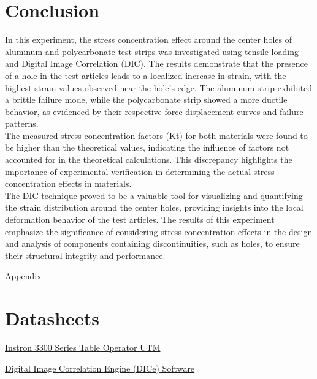 \documentclass{article}
\begin{document}
\section{Conclusion}

In this experiment, the stress concentration effect around the center holes of aluminum and polycarbonate test strips was investigated using tensile loading and Digital Image Correlation (DIC). The results demonstrate that the presence of a hole in the test articles leads to a localized increase in strain, with the highest strain values observed near the hole's edge. The aluminum strip exhibited a brittle failure mode, while the polycarbonate strip showed a more ductile behavior, as evidenced by their respective force-displacement curves and failure patterns. \\

The measured stress concentration factors (Kt) for both materials were found to be higher than the theoretical values, indicating the influence of factors not accounted for in the theoretical calculations. This discrepancy highlights the importance of experimental verification in determining the actual stress concentration effects in materials. \\

The DIC technique proved to be a valuable tool for visualizing and quantifying the strain distribution around the center holes, providing insights into the local deformation behavior of the test articles. The results of this experiment emphasize the significance of considering stress concentration effects in the design and analysis of components containing discontinuities, such as holes, to ensure their structural integrity and performance.

\newpage
\thispagestyle{empty}  %
\begin{center}
	\vspace*{\fill}
	{\Huge Appendix}
	\vspace*{\fill}
\end{center}

\newpage
\begin{appendices}
\pagestyle{fancy}
\renewcommand{\thefigure}{A\arabic{figure}}
\setcounter{figure}{0}

\pagebreak

\hypertarget{datasheets}{}
\section{Datasheets}
\begin{enumerate}[label = {[\arabic*]}]
\small
\item \hypertarget{1}{\href{https://www.instron.com/en/products/testing-systems/universal-testing-systems/low-force-universal-testing-systems/3300-series}{Instron 3300 Series Table Operator UTM}}
\item \hypertarget{2}{\href{https://www.sandia.gov/ccr/software/digital-image-correlation-engine-dice/}{Digital Image Correlation Engine (DICe) Software}}


\end{enumerate}

\end{appendices}
\end{document}

